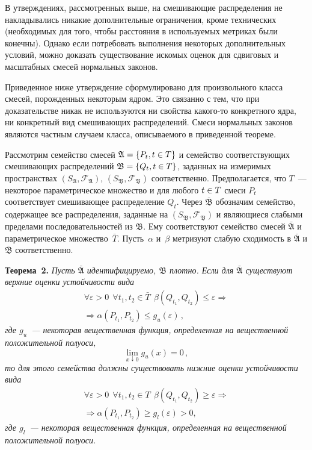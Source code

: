 \begin{multicols}{2}
В утверждениях, рассмотренных выше, на смешивающие распределения не
накладывались никакие дополнительные ограничения, кроме технических
(необходимых для того, чтобы расстояния в используемых метриках были
конечны). Однако если потребовать выполнения некоторых
дополнительных условий, можно доказать существование искомых оценок
для сдвиговых и масштабных смесей нормальных законов.

Приведенное ниже утверждение сформулировано для произвольного класса
смесей, порожденных некоторым ядром. Это связанно с тем, что при
доказательстве никак не используются ни свойства ка\-ко\-го-то
конкретного ядра, ни конкретный вид смешивающих распределений. Смеси
нормальных законов являются частным случаем класса, описываемого в
приведенной теореме.

Рассмотрим семейство смесей $\mathfrak{A} \hm= \{P_t, t\in T\}$ и
семейство соответствующих смешивающих распределений $\mathfrak{B} \hm=
\{Q_t, t\in T\}$, заданных на измеримых пространствах
$(S_{\mathfrak{A}}, \mathcal{F}_{\mathfrak{A}})$,
$(S_{\mathfrak{B}}, \mathcal{F}_{\mathfrak{B}})$ соответственно.
Предполагается, что $T$~--- некоторое параметрическое множество и для
любого $t\hm\in T$ смеси $P_t$ соответствует смешивающее распределение
$Q_t$.  Через $\bar{\mathfrak{B}}$ обозначим семейство, содержащее
все распределения, заданные на $(S_{\mathfrak{B}},
\mathcal{F}_{\mathfrak{B}})$ и являющиеся слабыми пределами
последовательностей из  $\mathfrak{B}$. Ему соответствуют семейство
смесей $\bar{\mathfrak{A}}$ и параметрическое множество~$\bar{T}$.
Пусть~$\alpha$ и~$\beta$ метризуют слабую сходимость в
$\bar{\mathfrak{A}}$ и $\bar{\mathfrak{B}}$ соответственно.

\medskip

\noindent
\textbf{Теорема~2.}
\textit{Пусть $\bar{\mathfrak{A}}$ идентифицируемо, $\mathfrak{B}$ плотно.
Если для  $\bar{\mathfrak{A}}$ существуют верхние оценки
устойчивости вида}
\begin{multline*}
\forall \varepsilon > 0  \ \ \forall t_1, t_2 \in  \bar{T}  \ \
\beta(Q_{t_1}, Q_{t_2}) \le \varepsilon   \Rightarrow {}\\
{}\Rightarrow \alpha(P_{t_1}, P_{t_2}) \le g_u(\varepsilon)\,,
\end{multline*}
\textit{где $g_u$~--- некоторая вещественная функция, определенная на
вещественной положительной полуоси,
$$
\lim\limits_{x\downarrow 0} g_u(x) = 0\,,
$$
то для этого семейства должны существовать нижние оценки устойчивости вида
\begin{multline*}
\forall \varepsilon > 0  \ \ \forall t_1, t_2 \in T \ \
\beta(Q_{t_1}, Q_{t_2}) \ge \varepsilon    \Rightarrow{}\\
{}\Rightarrow \alpha(P_{t_1}, P_{t_2}) \ge g_l(\varepsilon)>0,
\end{multline*}
где $g_l$~--- некоторая вещественная функция, определенная на
вещественной положительной полуоси.}


\end{multicols}

